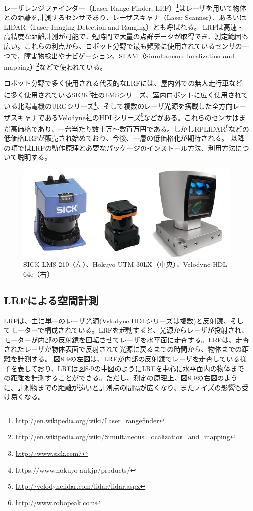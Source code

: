 レーザレンジファインダー（Laser Range Finder, LRF）\footnote{\url{http://en.wikipedia.org/wiki/Laser_rangefinder}}はレーザを用いて物体との距離を計測するセンサであり、レーザスキャナ（Laser Scanner）、あるいはLIDAR（Laser Imaging Detection and Ranging）とも呼ばれる。
LRFは高速・高精度な距離計測が可能で、短時間で大量の点群データが取得でき、測定範囲も広い。これらの利点から、ロボット分野で最も頻繁に使用されているセンサの一つで、障害物検出やナビゲーション、SLAM（Simultaneous localization and mapping）\footnote{\url{http://en.wikipedia.org/wiki/Simultaneous_localization_and_mapping}}などで使われている。

ロボット分野で多く使用される代表的なLRFには、屋内外での無人走行車などに多く使用されているSICK\footnote{\url{http://www.sick.com/}}社のLMSシリーズ、室内ロボットに広く使用されている北陽電機のURGシリーズ\footnote{\url{https://www.hokuyo-aut.jp/products/}}、そして複数のレーザ光源を搭載した全方向レーザスキャナであるVelodyne社のHDLシリーズ\footnote{\url{http://velodynelidar.com/lidar/lidar.aspx}}などがある。これらのセンサはまだ高価格であり、一台当たり数十万～数百万円である。しかしRPLIDAR\footnote{\url{http://www.robopeak.com}}などの低価格LRFが販売され始めており、今後、一層の低価格化が期待される。
以降の項ではLRFの動作原理と必要なパッケージのインストール方法、利用方法について説明する。

\begin{figure}[htp]
  \centering
  \includegraphics[width=12cm]{pictures/chapter8/pic_08_08.png}
  \caption{SICK LMS 210（左）、Hokuyo UTM-30LX（中央）、Velodyne HDL-64e（右）}
\end{figure}

\subsection{LRFによる空間計測}

LRFは、主に単一のレーザ光源(Velodyne HDLシリーズは複数)と反射鏡、そしてモーターで構成されている。LRFを起動すると、光源からレーザが投射され、モーターが内部の反射鏡を回転させてレーザを水平面に走査する。LRFは、走査されたレーザが物体表面で反射されて光源に戻るまでの時間から、物体までの距離を計測する。
図8-9の左図は、LRFが内部の反射鏡でレーザを走査している様子を表しており、LRFは図8-9の中図のようにLRFを中心に水平面内の物体までの距離を計測することができる。ただし、測定の原理上、図8-9の右図のように、計測物までの距離が遠いと計測点の間隔が広くなり、またノイズの影響も受け易くなる。

